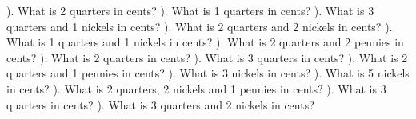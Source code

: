\documentclass{article}%
\begin{document}
\newline%
). What is 2 quarters in cents?%
\newline%
\newline%
). What is 1 quarters in cents?%
\newline%
\newline%
). What is 3 quarters and 1 nickels in cents?%
\newline%
\newline%
). What is 2 quarters and 2 nickels in cents?%
\newline%
\newline%
). What is 1 quarters and 1 nickels in cents?%
\newline%
\newline%
). What is 2 quarters and 2 pennies in cents?%
\newline%
\newline%
). What is 2 quarters in cents?%
\newline%
\newline%
). What is 3 quarters in cents?%
\newline%
\newline%
). What is 2 quarters and 1 pennies in cents?%
\newline%
\newline%
). What is 3 nickels in cents?%
\newline%
\newline%
). What is 5 nickels in cents?%
\newline%
\newline%
). What is 2 quarters, 2 nickels and 1 pennies in cents?%
\newline%
\newline%
). What is 3 quarters in cents?%
\newline%
\newline%
). What is 3 quarters and 2 nickels in cents?%
\end{document}
